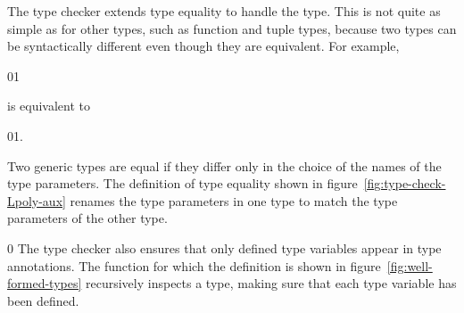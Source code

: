 \documentclass[7x10]{TimesAPriori_MIT}%
\def\racketEd{0}
\def\pythonEd{1}
\def\edition{1}
\newcommand{\racket}[1]{{\if\edition\racketEd{#1}\fi}}
\newcommand{\pythonColor}[0]{}
\newcommand{\python}[1]{{\if\edition\pythonEd\pythonColor #1\fi}}
\numberwithin{theorem}{chapter}
\numberwithin{definition}{chapter}
\numberwithin{equation}{chapter}
\begin{document}
The type checker extends type equality to handle the  type.
This is not quite as simple as for other types, such as function and
tuple types, because two  types can be syntactically
different even though they are equivalent. For example,
\begin{center}
\racket{}\python{}
\end{center}
is equivalent to
\begin{center}
\racket{}\python{}.
\end{center}
Two generic types are equal if they differ only in
the choice of the names of the type parameters. The definition of type
equality shown in figure~\ref{fig:type-check-Lpoly-aux} renames the type
parameters in one type to match the type parameters of the other type.

{\if\edition\racketEd
%
The type checker also ensures that only defined type variables appear
in type annotations. The  function for which
the definition is shown in figure~\ref{fig:well-formed-types}
recursively inspects a type, making sure that each type variable has
been defined.
%
\fi}
\end{document}
